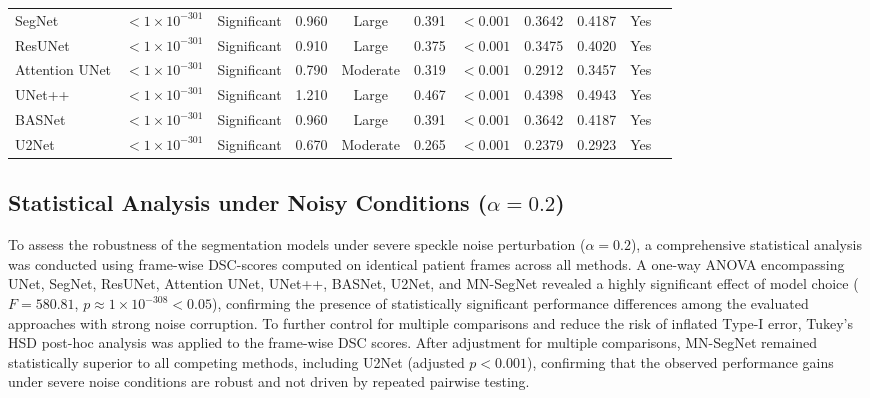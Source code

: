 \documentclass[12pt,letterpaper]{article}
\begin{document}
\begin{table}[htbp]
{\begin{tabular}{lcccccccccc}
SegNet
& $< 1 \times 10^{-301}$ & Significant & 0.960 & Large
& 0.391 & $< 0.001$ & 0.3642 & 0.4187 & Yes \\

ResUNet
& $< 1 \times 10^{-301}$ & Significant & 0.910 & Large
& 0.375 & $< 0.001$ & 0.3475 & 0.4020 & Yes \\

Attention UNet
& $< 1 \times 10^{-301}$ & Significant & 0.790 & Moderate
& 0.319 & $< 0.001$ & 0.2912 & 0.3457 & Yes \\

UNet++
& $< 1 \times 10^{-301}$ & Significant & 1.210 & Large
& 0.467 & $< 0.001$ & 0.4398 & 0.4943 & Yes \\

BASNet
& $< 1 \times 10^{-301}$ & Significant & 0.960 & Large
& 0.391 & $< 0.001$ & 0.3642 & 0.4187 & Yes \\

U2Net
& $< 1 \times 10^{-301}$ & Significant & 0.670 & Moderate
& 0.265 & $< 0.001$ & 0.2379 & 0.2923 & Yes \\
\hline
\end{tabular}
}
\end{table}
 

\subsection{Statistical Analysis under Noisy Conditions ($\alpha = 0.2$)}

To assess the robustness of the segmentation models under severe speckle noise
perturbation ($\alpha = 0.2$), a comprehensive statistical analysis was conducted
using frame-wise DSC-scores computed on identical patient frames across all
methods. A one-way ANOVA encompassing UNet, SegNet,
ResUNet, Attention UNet, UNet++, BASNet, U2Net, and MN-SegNet revealed a highly
significant effect of model choice ($F = 580.81$, $p \approx 1 \times 10^{-308} < 0.05$),
confirming the presence of statistically significant performance differences
among the evaluated approaches with strong noise corruption. To further control for multiple comparisons and reduce the risk of inflated
Type-I error, Tukey’s HSD post-hoc analysis was applied to the frame-wise DSC
scores. After adjustment for multiple comparisons, MN-SegNet remained
statistically superior to all competing methods, including U2Net (adjusted
$p < 0.001$), confirming that the observed performance gains under severe noise
conditions are robust and not driven by repeated pairwise testing.
\end{document}
